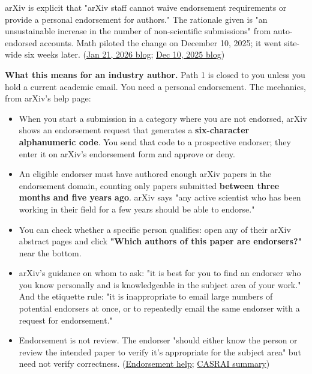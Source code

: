 \documentclass[twocolumn,10pt,letterpaper]{article}
\begin{document}
arXiv is explicit that "arXiv staff cannot waive endorsement requirements or provide a personal endorsement for authors." The rationale given is "an unsustainable increase in the number of non-scientific submissions" from auto-endorsed accounts. Math piloted the change on December 10, 2025; it went site-wide six weeks later. (\href{https://blog.arxiv.org/2026/01/21/attention-authors-updated-endorsement-policy/}{Jan 21, 2026 blog}; \href{https://blog.arxiv.org/2025/12/10/updated-endorsement-policy-for-arxiv-mathematics/}{Dec 10, 2025 blog})


\textbf{What this means for an industry author.} Path 1 is closed to you unless you hold a current academic email. You need a personal endorsement. The mechanics, from arXiv's help page:


\begin{itemize}
\setlength{\itemsep}{0pt}
\setlength{\parskip}{0pt}
  \item When you start a submission in a category where you are not endorsed, arXiv shows an endorsement request that generates a \textbf{six-character alphanumeric code}. You send that code to a prospective endorser; they enter it on arXiv's endorsement form and approve or deny.
  \item An eligible endorser must have authored enough arXiv papers in the endorsement domain, counting only papers submitted \textbf{between three months and five years ago}. arXiv says "any active scientist who has been working in their field for a few years should be able to endorse."
  \item You can check whether a specific person qualifies: open any of their arXiv abstract pages and click \textbf{"Which authors of this paper are endorsers?"} near the bottom.
  \item arXiv's guidance on whom to ask: "it is best for you to find an endorser who you know personally and is knowledgeable in the subject area of your work." And the etiquette rule: "it is inappropriate to email large numbers of potential endorsers at once, or to repeatedly email the same endorser with a request for endorsement."
  \item Endorsement is not review. The endorser "should either know the person or review the intended paper to verify it's appropriate for the subject area" but need not verify correctness. (\href{https://info.arxiv.org/help/endorsement.html}{Endorsement help}; \href{https://casrai.org/dictionary/term/arxiv-endorsement-system}{CASRAI summary})
\end{itemize}
\end{document}
